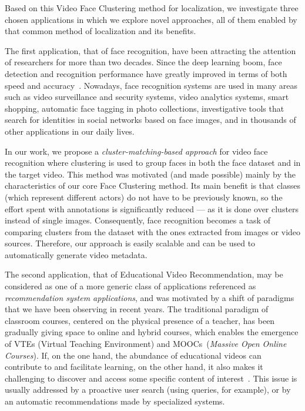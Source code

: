 Based on this Video Face Clustering method for localization, we investigate three chosen applications in which we explore novel approaches, all of them enabled by that common method of localization and its benefits. 

The first application, that of face recognition, have been attracting the attention of researchers for more than two decades. Since the deep learning boom, face detection and recognition performance have greatly improved in terms of both speed and accuracy~\cite{masi2018deep}. Nowadays, face recognition systems are used in many areas such as video surveillance and security systems, video analytics systems, smart shopping, automatic face tagging in photo collections, investigative tools that search for identities in social networks based on face images, and in thousands of other applications in our daily lives.

In our work, we propose a \textit{cluster-matching-based approach} for video face recognition where clustering is used to group faces in both the face dataset and in the target video. This method was motivated (and made possible) mainly by the characteristics of our core Face Clustering method. Its main benefit is that classes (which represent different actors) do not have to be previously known, so the effort spent with annotations is significantly reduced --- as it is done over clusters instead of single images. Consequently, face recognition becomes a task of comparing clusters from the dataset with the ones extracted from images or video sources. Therefore, our approach is easily scalable and can be used to automatically generate video metadata.

The second application, that of Educational Video Recommendation, may be considered as one of a more generic class of applications referenced as \textit{recommendation system applications}, and was motivated by a shift of paradigms that we have been observing in recent years. The traditional paradigm of classroom courses, centered on the physical presence of a teacher, has been gradually giving space to online and hybrid courses, which enables the emergence of VTEs (Virtual Teaching Environment) and MOOCs~(\textit{Massive Open Online Courses}).
If, on the one hand, the abundance of educational videos can contribute to and facilitate learning, on the other hand, it also makes it challenging to discover and access some specific content of interest~\cite{dias2017approach}.
This issue is usually addressed by a proactive user search (using queries, for example), or by an automatic recommendations made by specialized systems.


